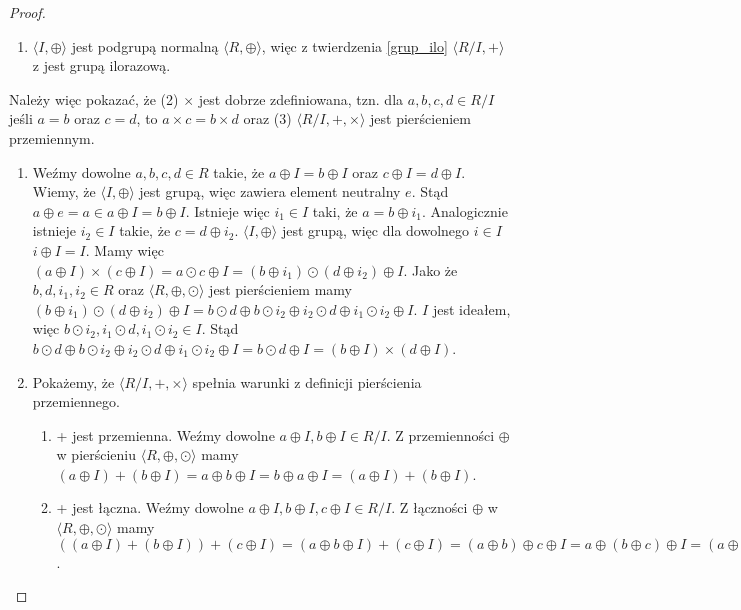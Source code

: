 \documentclass[polish,declaration,shortabstract]{iithesis}
\theoremstyle{definition}
\theoremstyle{remark} \newtheorem{observation}{Obserwacja}
\theoremstyle{plain} \newtheorem{theorem}{Twierdzenie}
\theoremstyle{plain} \newtheorem{lemma}{Lemat}
\theoremstyle{remark} \newtheorem*{remark*}{Uwaga}
\theoremstyle{reminder} \newtheorem*{reminder*}{Przypomnienie}
\begin{document}
\begin{proof}
	\begin{enumerate}[label=(\arabic*),leftmargin=.4in]
		\item $\langle I, \oplus \rangle$ jest podgrupą normalną $\langle R, \oplus \rangle$, więc z twierdzenia \ref{grup_ilo} $\langle R/I, + \rangle$ z jest grupą ilorazową.
	\end{enumerate}
	Należy więc pokazać, że (2) $\times$ jest dobrze zdefiniowana, tzn. dla $a, b, c, d \in R/I$ jeśli $a = b$ oraz $c = d$, to $a \times c = b \times d$ oraz (3) $\langle R/I, +, \times \rangle$ jest pierścieniem przemiennym.
	\begin{enumerate}[resume,label=(\arabic*),leftmargin=.4in]
		\item Weźmy dowolne $a, b, c, d \in R$ takie, że $a \oplus I = b \oplus I$ oraz $c \oplus I = d \oplus I$. Wiemy, że $\langle I, \oplus \rangle$ jest grupą, więc zawiera element neutralny $e$. Stąd $a \oplus e = a \in a \oplus I = b \oplus I$. Istnieje więc $i_1 \in I$ taki, że $a = b \oplus i_1$. Analogicznie istnieje $i_2 \in I$ takie, że $c = d \oplus i_2$. \newline
		      $\langle I, \oplus \rangle$ jest grupą, więc dla dowolnego $i \in I$ $i \oplus I = I$. \newline
		      Mamy więc $(a \oplus I) \times (c \oplus I) = a \odot c \oplus I = (b \oplus i_1) \odot (d \oplus i_2) \oplus I$. Jako że $b, d, i_1, i_2 \in R$ oraz $\langle R, \oplus, \odot \rangle$ jest pierścieniem mamy $(b \oplus i_1) \odot (d \oplus i_2) \oplus I = b \odot d \oplus b \odot i_2 \oplus i_2 \odot d \oplus i_1 \odot i_2 \oplus I$. $I$ jest ideałem, więc $b \odot i_2, i_1 \odot d, i_1 \odot i_2 \in I$. Stąd $b \odot d \oplus b \odot i_2 \oplus i_2 \odot d \oplus i_1 \odot i_2 \oplus I = b \odot d \oplus I = (b \oplus I) \times (d \oplus I)$.
		\item Pokażemy, że $\langle R/I, +, \times \rangle$ spełnia warunki z definicji pierścienia przemiennego.
		      \begin{enumerate}[label=(3.\arabic*)]  	    
		      	\item + jest przemienna. Weźmy dowolne $a \oplus I, b \oplus I \in R/I$. Z przemienności $\oplus$ w pierścieniu $\langle R, \oplus, \odot \rangle$ mamy $(a \oplus I) + (b \oplus I) = a \oplus b \oplus I = b \oplus a \oplus I = (a \oplus I) + (b \oplus I)$.
		      	\item + jest łączna. Weźmy dowolne $a \oplus I, b \oplus I, c \oplus I \in R/I$. Z łączności $\oplus$ w $\langle R, \oplus, \odot \rangle$ mamy $((a \oplus I) + (b \oplus I)) + (c \oplus I) = (a \oplus b \oplus I) + (c \oplus I) = (a \oplus b) \oplus c \oplus I = a \oplus (b \oplus c) \oplus I = (a \oplus I) + (b \oplus c \oplus I) = (a \oplus I) + ((b \oplus I) + (c \oplus I))$.

\end{enumerate}
\end{enumerate}
\end{proof}
\end{document}
